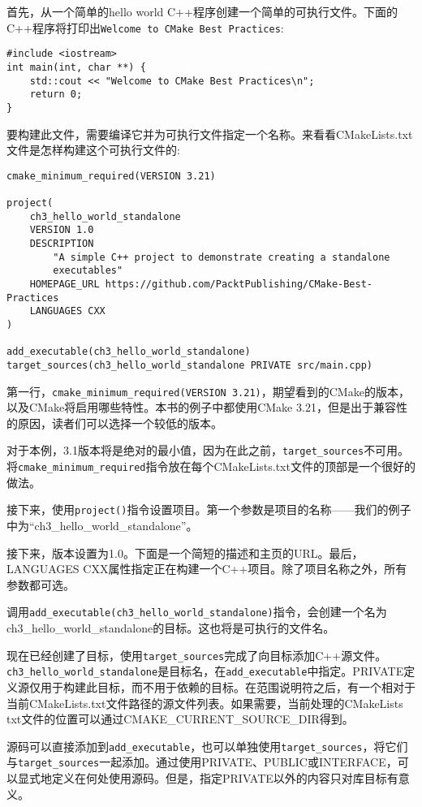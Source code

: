 首先，从一个简单的hello world C++程序创建一个简单的可执行文件。下面的C++程序将打印出\texttt{Welcome to CMake Best Practices}:

\begin{lstlisting}[style=styleCXX]
#include <iostream>
int main(int, char **) {
	std::cout << "Welcome to CMake Best Practices\n";
	return 0;
}
\end{lstlisting}

要构建此文件，需要编译它并为可执行文件指定一个名称。来看看CMakeLists.txt文件是怎样构建这个可执行文件的:

\begin{lstlisting}[style=styleCMake]
cmake_minimum_required(VERSION 3.21)

project(
	ch3_hello_world_standalone
	VERSION 1.0
	DESCRIPTION
		"A simple C++ project to demonstrate creating a standalone
		executables"
	HOMEPAGE_URL https://github.com/PacktPublishing/CMake-Best-Practices
	LANGUAGES CXX
)

add_executable(ch3_hello_world_standalone)
target_sources(ch3_hello_world_standalone PRIVATE src/main.cpp)
\end{lstlisting}

第一行，\texttt{cmake\_minimum\_required(VERSION 3.21)}，期望看到的CMake的版本，以及CMake将启用哪些特性。本书的例子中都使用CMake 3.21，但是出于兼容性的原因，读者们可以选择一个较低的版本。

对于本例，3.1版本将是绝对的最小值，因为在此之前，\texttt{target\_sources}不可用。将\texttt{cmake\_minimum\_required}指令放在每个CMakeLists.txt文件的顶部是一个很好的做法。

接下来，使用\texttt{project()}指令设置项目。第一个参数是项目的名称——我们的例子中为“ch3\_hello\_world\_standalone”。

接下来，版本设置为1.0。下面是一个简短的描述和主页的URL。最后，LANGUAGES CXX属性指定正在构建一个C++项目。除了项目名称之外，所有参数都可选。

调用\texttt{add\_executable(ch3\_hello\_world\_standalone)}指令，会创建一个名为ch3\_hello\_world\_standalone的目标。这也将是可执行的文件名。

现在已经创建了目标，使用\texttt{target\_sources}完成了向目标添加C++源文件。\texttt{ch3\_hello\_world\_standalone}是目标名，在\texttt{add\_executable}中指定。PRIVATE定义源仅用于构建此目标，而不用于依赖的目标。在范围说明符之后，有一个相对于当前CMakeLists.txt文件路径的源文件列表。如果需要，当前处理的CMakeLists txt文件的位置可以通过CMAKE\_CURRENT\_SOURCE\_DIR得到。

源码可以直接添加到\texttt{add\_executable}，也可以单独使用\texttt{target\_sources}，将它们与\texttt{target\_sources}一起添加。通过使用PRIVATE、PUBLIC或INTERFACE，可以显式地定义在何处使用源码。但是，指定PRIVATE以外的内容只对库目标有意义。

